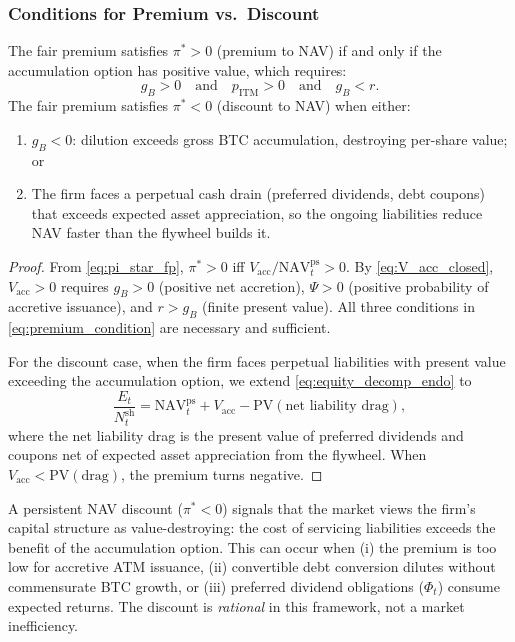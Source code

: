 \subsubsection{Conditions for Premium vs.\ Discount}

\begin{proposition}\label{prop:premium_discount}
The fair premium satisfies $\pi^* > 0$ (premium to NAV) if and only if the
accumulation option has positive value, which requires:
\begin{equation}\label{eq:premium_condition}
  g_B > 0
  \quad\text{and}\quad
  p_{\mathrm{ITM}} > 0
  \quad\text{and}\quad
  g_B < r.
\end{equation}
The fair premium satisfies $\pi^* < 0$ (discount to NAV) when either:
\begin{enumerate}
  \item $g_B < 0$: dilution exceeds gross BTC accumulation, destroying
    per-share value; or
  \item The firm faces a perpetual cash drain (preferred dividends, debt
    coupons) that exceeds expected asset appreciation, so the ongoing
    liabilities reduce NAV faster than the flywheel builds it.
\end{enumerate}
\end{proposition}

\begin{proof}
From \eqref{eq:pi_star_fp}, $\pi^* > 0$ iff
$V_{\mathrm{acc}} / \mathrm{NAV}_t^{\mathrm{ps}} > 0$.  By
\eqref{eq:V_acc_closed}, $V_{\mathrm{acc}} > 0$ requires $g_B > 0$
(positive net accretion), $\Psi > 0$ (positive probability of accretive
issuance), and $r > g_B$ (finite present value).  All three conditions
in \eqref{eq:premium_condition} are necessary and sufficient.

For the discount case, when the firm faces perpetual liabilities with
present value exceeding the accumulation option, we extend
\eqref{eq:equity_decomp_endo} to
\[
  \frac{E_t}{N_t^{\mathrm{sh}}}
  = \mathrm{NAV}_t^{\mathrm{ps}} + V_{\mathrm{acc}}
  - \mathrm{PV}(\text{net liability drag}),
\]
where the net liability drag is the present value of preferred dividends
and coupons net of expected asset appreciation from the flywheel.
When $V_{\mathrm{acc}} < \mathrm{PV}(\text{drag})$, the premium turns
negative.
\end{proof}

\begin{remark}
A persistent NAV discount ($\pi^* < 0$) signals that the market views the
firm's capital structure as value-destroying: the cost of servicing
liabilities exceeds the benefit of the accumulation option.  This can occur
when (i) the premium is too low for accretive ATM issuance, (ii) convertible
debt conversion dilutes without commensurate BTC growth, or (iii) preferred
dividend obligations ($\Phi_t$) consume expected returns.  The discount is
\emph{rational} in this framework, not a market inefficiency.
\end{remark}

